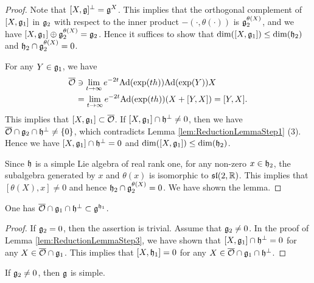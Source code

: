 \begin{proof}
	Note that $[X, \mathfrak{g}]^\perp = \mathfrak{g}^X$.
	This implies that the orthogonal complement of $[X, \mathfrak{g}_1]$ in $\mathfrak{g}_2$ with respect to the inner product $-(\cdot, \theta(\cdot))$ is $\mathfrak{g}_2^{\theta(X)}$, and we have $[X, \mathfrak{g}_1] \oplus \mathfrak{g}_2^{\theta(X)} = \mathfrak{g}_2$.
	Hence it suffices to show that $\dim([X, \mathfrak{g}_1]) \leq \dim(\mathfrak{h}_2)$ and $\mathfrak{h}_2 \cap \mathfrak{g}_2^{\theta(X)} = 0$.

	For any $Y \in \mathfrak{g}_1$, we have
	\begin{align*}
		\overline{\mathcal{O}} &\ni \lim_{t \to \infty} e^{-2t} \mathrm{Ad}(\exp(th))\mathrm{Ad}(\exp(Y))X \\
		&= \lim_{t \to \infty} e^{-2t} \mathrm{Ad}(\exp(th))(X + [Y, X]) = [Y, X].
	\end{align*}
	This implies that $[X, \mathfrak{g}_1] \subset \overline{\mathcal{O}}$.
	If $[X, \mathfrak{g}_1] \cap \mathfrak{h}^\perp \neq 0$, then we have $\overline{\mathcal{O}}\cap \mathfrak{g}_2 \cap \mathfrak{h}^\perp \neq \left\{0 \right\}$, which contradicts Lemma \ref{lem:ReductionLemmaStep1} (3).
	Hence we have $[X, \mathfrak{g}_1] \cap \mathfrak{h}^\perp = 0$ and $\dim([X, \mathfrak{g}_1]) \leq \dim(\mathfrak{h}_2)$.

	Since $\mathfrak{h}$ is a simple Lie algebra of real rank one, for any non-zero $x \in \mathfrak{h}_2$, the subalgebra generated by $x$ and $\theta(x)$ is isomorphic to $\mathfrak{sl}(2,\mathbb{R})$.
	This implies that $[\theta(X), x] \neq 0$ and hence $\mathfrak{h}_2 \cap \mathfrak{g}_2^{\theta(X)} = 0$.
	We have shown the lemma.
\end{proof}

\begin{corollary} \label{cor:ReductionLemmaStep3}
	One has $\overline{\mathcal{O}} \cap \mathfrak{g}_1 \cap \mathfrak{h}^\perp\subset \mathfrak{g}^{\mathfrak{h}_1}$.
\end{corollary}

\begin{proof}
	If $\mathfrak{g}_2 = 0$, then the assertion is trivial.
	Assume that $\mathfrak{g}_2 \neq 0$.
	In the proof of Lemma \ref{lem:ReductionLemmaStep3}, we have shown that $[X, \mathfrak{g}_1] \cap \mathfrak{h}^\perp = 0$ for any $X \in \overline{\mathcal{O}} \cap \mathfrak{g}_1$.
	This implies that $[X, \mathfrak{h}_1] = 0$ for any $X \in \overline{\mathcal{O}} \cap \mathfrak{g}_1 \cap \mathfrak{h}^\perp$.
\end{proof}

\begin{lemma} \label{lem:ReductionLemmaStep4}
	If $\mathfrak{g}_2 \neq 0$, then $\mathfrak{g}$ is simple.
\end{lemma}


